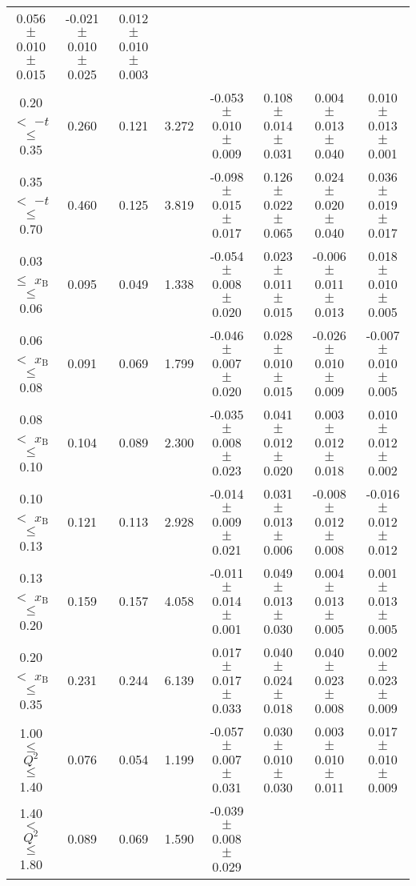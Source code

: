 {\begin{table}[width=15cm]
\begin{center}
{\begin{tabular}{|c|c|c|c|c|c|c|c|}
0.056 $\pm$  0.010  $\pm$   0.015 &  -0.021  $\pm$  0.010  $\pm$  0.025 & 0.012   $\pm$  0.010    $\pm$  0.003\\
0.20 $<$ $-t$ $\leqslant$ 0.35 &  0.260 & 0.121 &  3.272 &  -0.053 $\pm$   0.010  $\pm$  0.009 &
0.108 $\pm$  0.014  $\pm$ 0.031 & 0.004 $\pm$   0.013  $\pm$  0.040 & 0.010  $\pm$   0.013   $\pm$   0.001\\
0.35 $<$ $-t$ $\leqslant$ 0.70 &  0.460 & 0.125 &  3.819 &  -0.098  $\pm$  0.015  $\pm$   0.017 & 
0.126 $\pm$  0.022  $\pm$   0.065 & 0.024 $\pm$   0.020  $\pm$  0.040 & 0.036   $\pm$  0.019   $\pm$ 0.017\\
\hline
0.03 $\leqslant$ $x_{\textrm{B}}$ $\leqslant$ 0.06 &  0.095 & 0.049 &  1.338 &  -0.054  $\pm$  0.008  $\pm$   0.020 & 
0.023  $\pm$  0.011  $\pm$   0.015 & -0.006 $\pm$  0.011 $\pm$  0.013 &  0.018   $\pm$  0.010  $\pm$    0.005\\
0.06 $<$ $x_{\textrm{B}}$ $\leqslant$ 0.08 &  0.091 & 0.069 &  1.799 &   -0.046  $\pm$  0.007  $\pm$   0.020 &
0.028  $\pm$  0.010  $\pm$   0.015 & -0.026  $\pm$ 0.010  $\pm$  0.009 & -0.007   $\pm$  0.010   $\pm$   0.005\\
0.08 $<$ $x_{\textrm{B}}$ $\leqslant$ 0.10 &  0.104 & 0.089 &  2.300 &  -0.035  $\pm$  0.008  $\pm$   0.023 & 
0.041  $\pm$  0.012  $\pm$   0.020 & 0.003 $\pm$  0.012 $\pm$    0.018 & 0.010   $\pm$  0.012    $\pm$  0.002\\
0.10 $<$ $x_{\textrm{B}}$ $\leqslant$ 0.13 &  0.121 &  0.113 &  2.928 &  -0.014  $\pm$  0.009  $\pm$   0.021 & 
0.031  $\pm$  0.013 $\pm$   0.006 & -0.008 $\pm$  0.012  $\pm$   0.008 & -0.016   $\pm$  0.012  $\pm$    0.012\\
0.13 $<$ $x_{\textrm{B}}$ $\leqslant$ 0.20 &  0.159 & 0.157 &  4.058&   -0.011   $\pm$ 0.014  $\pm$   0.001 & 
0.049  $\pm$  0.013 $\pm$    0.030 & 0.004  $\pm$  0.013  $\pm$   0.005 & 0.001   $\pm$  0.013   $\pm$  0.005\\
0.20 $<$ $x_{\textrm{B}}$ $\leqslant$ 0.35 &  0.231 & 0.244 &  6.139 &  0.017 $\pm$  0.017   $\pm$  0.033 & 
0.040  $\pm$  0.024   $\pm$  0.018 & 0.040  $\pm$  0.023  $\pm$   0.008 & 0.002  $\pm$   0.023  $\pm$   0.009\\
\hline
1.00 $\leqslant$ $Q^{2}$ $\leqslant$ 1.40 &  0.076 & 0.054  & 1.199 &  -0.057  $\pm$  0.007  $\pm$   0.031 & 
0.030  $\pm$  0.010  $\pm$   0.030 &  0.003 $\pm$  0.010  $\pm$  0.011 & 0.017  $\pm$  0.010   $\pm$   0.009\\
1.40 $<$ $Q^{2}$ $\leqslant$ 1.80 &  0.089 & 0.069 &  1.590 &  -0.039  $\pm$  0.008  $\pm$   0.029 & 

\end{tabular}}
\end{center}
\end{table}}

